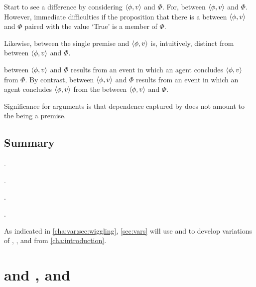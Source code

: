 \begin{note}
  Start to see a difference by considering \(\langle \phi, v \rangle\) and \(\Phi\).
  For, \ros{} between \(\langle \phi, v \rangle\) and \(\Phi\).
  However, immediate difficulties if the proposition that there is a \ros{} between \(\langle \phi, v \rangle\) and \(\Phi\) paired with the value `True' is a member of \(\Phi\).

  Likewise, \ros{} between the single premise and \(\langle \phi, v \rangle\) is, intuitively, distinct from \ros{} between \(\langle \phi, v \rangle\) and \(\Phi\).

  \ros{} between \(\langle \phi, v \rangle\) and \(\Phi\) results from an event in which an agent concludes \(\langle \phi, v \rangle\) from \(\Phi\).
  By contrast, \ros{} between \(\langle \phi, v \rangle\) and \(\Phi\) results from an event in which an agent concludes \(\langle \phi, v \rangle\) from the \ros{} between \(\langle \phi, v \rangle\) and \(\Phi\).
\end{note}

\begin{note}
  Significance for arguments is that dependence captured by \qWhyVnP{} does not amount to the \ros{} being a premise.
\end{note}

\subsection{Summary}
\label{cha:var:ros:summary}

\begin{note}
  \supportI{}.

  .

  \supportII{}.

  .
\end{note}

\begin{note}
  As indicated in \autoref{cha:var:sec:wiggling}, \autoref{sec:vars} will use  and  to develop variations of \qWhy{}, \qHow{}, and \issueInclusion{} from \autoref{cha:introduction}.
\end{note}


\section{\qWhyVnP{} and \qHowV{}, and \issueConstraint{}}
\label{cha:var:sec:vars}

